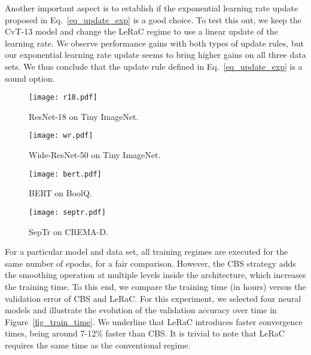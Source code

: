 \documentclass[10pt,twocolumn,letterpaper]{article}
\begin{document}
Another important aspect is to establish if the exponential learning rate update proposed in Eq.~\eqref{eq_update_exp} is a good choice. To test this out, we keep the CvT-13 model and change the LeRaC regime to use a linear update of the learning rate. We observe performance gains with both types of update rules, but our exponential learning rate update seems to bring higher gains on all three data sets. We thus conclude that the update rule defined in Eq.~\eqref{eq_update_exp} is a sound option.

\begin{figure*}
\begin{subfigure}{.5\textwidth}
  \centering
\texttt{[image: r18.pdf]}  
  \caption{ResNet-18 on Tiny ImageNet.}
  \label{fig:sub-third}
\end{subfigure}
\begin{subfigure}{.5\textwidth}
  \centering
\texttt{[image: wr.pdf]}  
  \caption{Wide-ResNet-50 on Tiny ImageNet.}
  \label{fig:sub-fourth}
\end{subfigure}
\begin{subfigure}{.5\textwidth}
  \centering
\texttt{[image: bert.pdf]}  
  \caption{BERT on BoolQ.}
  \label{fig:sub-second}
\end{subfigure}
\begin{subfigure}{.5\textwidth}
  \centering
  \texttt{[image: septr.pdf]}  
  \caption{SepTr on CREMA-D.}
  \label{fig:sub-first}
\end{subfigure}
\vspace{-0.3cm}
\caption{Validation accuracy (on the y-axis) versus training time (on the x-axis) for four distinct architectures. The number of training epochs is the same for both LeRaC and CBS, the observable time difference being caused by the overhead of CBS due to the Gaussian kernel layers.\vspace{-0.5cm}}
\label{fig_train_time}
\end{figure*}

For a particular model and data set, all training regimes are executed for the same number of epochs, for a fair comparison. However, the CBS strategy adds the smoothing operation at multiple levels inside the architecture, which increases the training time. To this end, we compare the training time (in hours) versus the validation error of CBS and LeRaC. For this experiment, we selected four neural models and illustrate the evolution of the validation accuracy over time in Figure~\ref{fig_train_time}. We underline that LeRaC introduces faster convergence times, being around 7-12\% faster than CBS. It is trivial to note that LeRaC requires the same time as the conventional regime.
\end{document}
